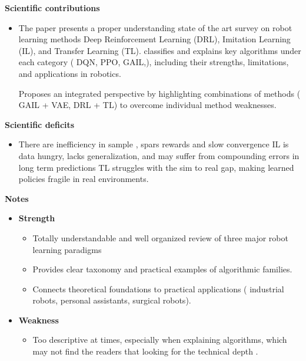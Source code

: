 \documentclass[report.tex]{subfiles}
\begin{document}
\noindent\textbf{Scientific contributions} 
\begin{itemize}
        \item The paper presents a proper understanding state of the art survey on robot learning methods
         Deep Reinforcement Learning (DRL), Imitation Learning (IL), and Transfer Learning (TL).
classifies and explains key algorithms under each category ( DQN, PPO, GAIL,), including
their strengths, limitations, and applications in robotics.

         Proposes an integrated perspective by highlighting combinations of methods ( GAIL +
VAE, DRL + TL) to overcome individual method weaknesses.
        
\end{itemize}

\noindent\textbf{Scientific deficits} 
\begin{itemize}
        \item There are inefficiency in sample , spars rewards and slow convergence  IL is data hungry, lacks generalization, and may suffer from compounding errors in long
term predictions TL struggles with the sim to real gap, making learned policies fragile in real environments.
       
\end{itemize}

\noindent\textbf{Notes}
\begin{itemize}
    \item \noindent\textbf {Strength}
    \begin{itemize}
        \item Totally understandable and well organized review of three major robot learning paradigms
        \item Provides clear taxonomy and practical examples of algorithmic families.
        \item Connects theoretical foundations to practical applications ( industrial robots, personal
assistants, surgical robots).
       
    \end{itemize}
    
    \item \noindent\textbf{Weakness}
    \begin{itemize}
        \item Too descriptive at times, especially when explaining algorithms, which may not find the
readers that looking for the technical depth .
    \end{itemize}
\end{itemize}
\end{document}
